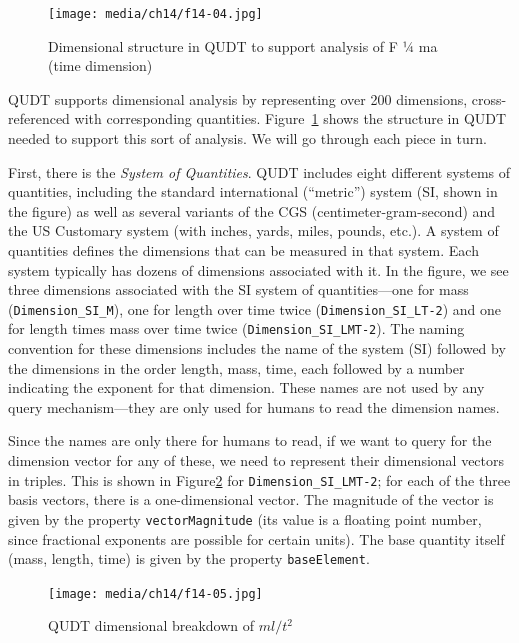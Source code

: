 \begin{figure}
\centering
\texttt{[image: media/ch14/f14-04.jpg]}
\caption{Dimensional structure in QUDT to support analysis of F ¼ ma (time
dimension)}
\label{fig:ch14.04}
\end{figure}






QUDT supports dimensional analysis by representing over 200 dimensions,
cross-referenced with corresponding quantities. Figure~\ref{fig:ch14.04} shows the
structure in QUDT needed to support this sort of analysis. We will go
through each piece in turn.

First, there is the \emph{System of Quantities}. QUDT includes eight different
systems of quantities, including the standard international (``metric'')
system (SI, shown in the figure) as well as several variants of the CGS
(centimeter-gram-second) and the US Customary system (with inches,
yards, miles, pounds, etc.). A system of quantities defines the
dimensions that can be measured in that system. Each system typically
has dozens of dimensions associated with it. In the figure, we see three
dimensions associated with the SI system of quantities---one for mass
(\texttt{Dimension\_SI\_M}), one for length over time twice (\texttt{Dimension\_SI\_LT-2})
and one for length times mass over time twice (\texttt{Dimension\_SI\_LMT-2}).
The naming convention for these dimensions includes the name of the
system (SI) followed by the dimensions in the order length, mass, time,
each followed by a number indicating the exponent for that dimension.
These names are not used by any query mechanism---they are only used for
humans to read the dimension names.

Since the names are only there for humans to read, if we want to query
for the dimension vector for any of these, we need to represent their
dimensional vectors in triples. This is shown in Figure\ref{fig:ch14.05} for
\texttt{Dimension\_SI\_LMT-2}; for each of the three basis vectors, there is a
one-dimensional vector. The magnitude of the vector is given by the
property \texttt{vectorMagnitude} (its value is a floating point number, since
fractional exponents are possible for certain units). The base quantity
itself (mass, length, time) is given by the property \texttt{baseElement}.


\begin{figure}
\centering
\texttt{[image: media/ch14/f14-05.jpg]}
\caption{QUDT dimensional breakdown of $ml/{t^2}$}
\label{fig:ch14.05}
\end{figure}

